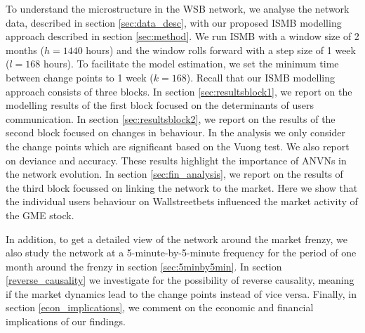 

To understand the microstructure in the WSB network, we analyse the network data, described in section \ref{sec:data_desc}, with our proposed ISMB modelling approach described in section \ref{sec:method}. %
We run ISMB with a window size of 2 months ($h =1440$ hours) and the window rolls forward with a step size of 1 week ($l = 168$ hours). %
To facilitate the model estimation, we set the minimum time between change points to 1 week ($k=168$).  %
Recall that our ISMB modelling approach consists of three blocks. %
In section \ref{sec:resultsblock1}, we report on the modelling results of the first block focused on the determinants of users communication. In section \ref{sec:resultsblock2}, we report on the results of the second block focused on changes in behaviour. In the analysis we only consider the change points which are significant based on the Vuong test. We also report on deviance and accuracy. These results highlight the importance of ANVNs in the network evolution. In section \ref{sec:fin_analysis}, we report on the results of the third block focussed on linking the network to the market. Here we show that the individual users behaviour on Wallstreetbets influenced the market activity of the GME stock.

In addition, to get a detailed view of the network around the market frenzy, we also study the network at a 5-minute-by-5-minute frequency for the period of one month around the frenzy in section \ref{sec:5minby5min}. In section \ref{reverse_causality} we investigate for the possibility of reverse causality, meaning if the market dynamics lead to the change points instead of vice versa. Finally, in section \ref{econ_implications}, we comment on the economic and financial implications of our findings. 

